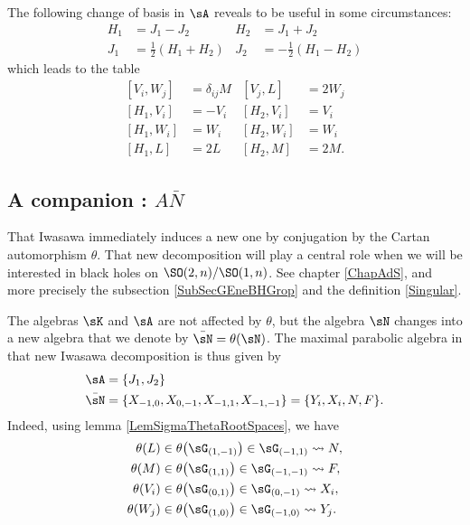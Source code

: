 The following change of basis in $\sA$ reveals to be useful in some circumstances:
\begin{subequations}  \label{EqChmHJ}
\begin{align}
  	H_1&=J_1-J_2			&H_2&=J_1+J_2\\
	J_1&=\frac{ 1 }{2}(H_1+H_2)	&J_2&=-\frac{ 1 }{2}(H_1-H_2)
\end{align}
\end{subequations}
which leads to the table
\begin{subequations}		\label{TableSeconde}
\begin{align}
{}[V_i,W_j]&=\delta_{ij}M		&[V_j,L]&=2W_j\\
[H_1,V_i]&=-V_i				&[H_2,V_i]&=V_i\\
[H_1,W_i]&=W_i				&[H_2,W_i]&=W_i\\
[H_1,L]&=2L				&[H_2,M]&=2M.
\end{align}
\end{subequations}

					\subsection{A companion : \texorpdfstring{$A\bar N$}{AN}}

That Iwasawa immediately induces a new one by conjugation by the Cartan automorphism $\theta$. That new decomposition will play a central role when we will be interested in black holes on $\SO(2,n)/\SO(1,n)$. See chapter \ref{ChapAdS}, and more precisely the subsection \ref{SubSecGEneBHGrop} and the definition \ref{Singular}. 

The algebras $\sK$ and $\sA$ are not affected by $\theta$, but the algebra $\sN$ changes into a new algebra that we denote by $\bar\sN=\theta(\sN)$. The maximal parabolic algebra in that new Iwasawa decomposition is thus given by
\begin{equation}
	\begin{aligned}[]
		\sA&=\{ J_1,J_2 \}\\
		\bar\sN&=\{ X_{-1,0},X_{0,-1},X_{-1,1},X_{-1,-1} \}=\{ Y_i,X_i,N,F \}.
	\end{aligned}
\end{equation}
Indeed, using lemma \ref{LemSigmaThetaRootSpaces}, we have
\begin{equation}
	\begin{aligned}[]
		\theta(L)&\in\theta\big( \sG_{(1,-1)} \big)\in\sG_{(-1,1)}\leadsto N,\\
		\theta(M)&\in\theta\big( \sG_{(1,1)} \big)\in\sG_{(-1,-1)}\leadsto F,\\
		\theta(V_i)&\in\theta\big( \sG_{(0,1)} \big)\in\sG_{(0,-1)}\leadsto X_i,\\
		\theta(W_j)&\in\theta\big( \sG_{(1,0)} \big)\in\sG_{(-1,0)}\leadsto Y_j.
	\end{aligned}
\end{equation}


